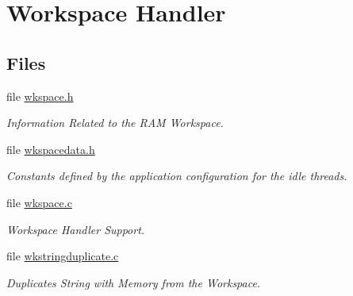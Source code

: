 \hypertarget{group__RTEMSScoreWorkspace}{}\section{Workspace Handler}
\label{group__RTEMSScoreWorkspace}
\subsection*{Files}
\begin{DoxyCompactItemize}
\item 
file \mbox{\hyperlink{score_2wkspace_8h}{wkspace.\+h}}
\begin{DoxyCompactList}\small\item\em Information Related to the R\+AM Workspace. \end{DoxyCompactList}\item 
file \mbox{\hyperlink{wkspacedata_8h}{wkspacedata.\+h}}
\begin{DoxyCompactList}\small\item\em Constants defined by the application configuration for the idle threads. \end{DoxyCompactList}\item 
file \mbox{\hyperlink{wkspace_8c}{wkspace.\+c}}
\begin{DoxyCompactList}\small\item\em Workspace Handler Support. \end{DoxyCompactList}\item 
file \mbox{\hyperlink{wkstringduplicate_8c}{wkstringduplicate.\+c}}
\begin{DoxyCompactList}\small\item\em Duplicates String with Memory from the Workspace. \end{DoxyCompactList}\end{DoxyCompactItemize}
